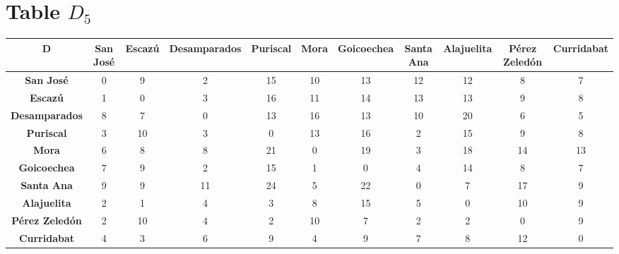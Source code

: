 \documentclass{article}
\begin{document}
\section{Table $D_{5}$}
\begin{center}
    \begin{tabular}{|c||c|c|c|c|c|c|c|c|c|c|}
        \hline
        \textbf{D} & \textbf{San José} & \textbf{Escazú} & \textbf{Desamparados} & \textbf{Puriscal} & \textbf{Mora} & \textbf{Goicoechea} & \textbf{Santa Ana} & \textbf{Alajuelita} & \textbf{Pérez Zeledón} & \textbf{Curridabat} \\
        \hline
        \hline
        \textbf{San José}& 0 & 9 & 2 & 15 & 10 & 13 & 12 & 12 & 8 & 7 \\
        \hline
        \textbf{Escazú}& 1 & 0 & 3 & 16 & 11 & 14 & 13 & 13 & 9 & 8 \\
        \hline
        \textbf{Desamparados}& 8 & 7 & 0 & 13 & 16 & 13 & 10 & 20 & 6 & 5 \\
        \hline
        \textbf{Puriscal}& 3 & 10 & 3 & 0 & 13 & 16 & 2 & 15 & 9 & 8 \\
        \hline
        \textbf{Mora}& 6 & 8 & 8 & 21 & 0 & 19 & 3 & 18 & 14 & 13 \\
        \hline
        \textbf{Goicoechea}& \cellcolor[HTML]{D74894}$7$ & 9 & 2 & 15 & 1 & 0 & \cellcolor[HTML]{D74894}$4$ & 14 & 8 & 7 \\
        \hline
        \textbf{Santa Ana}& 9 & 9 & 11 & 24 & 5 & 22 & 0 & 7 & 17 & 9 \\
        \hline
        \textbf{Alajuelita}& 2 & 1 & 4 & 3 & 8 & 15 & 5 & 0 & 10 & 9 \\
        \hline
        \textbf{Pérez Zeledón}& 2 & 10 & 4 & 2 & 10 & 7 & 2 & 2 & 0 & 9 \\
        \hline
        \textbf{Curridabat}& 4 & 3 & 6 & 9 & 4 & 9 & \cellcolor[HTML]{D74894}$7$ & 8 & 12 & 0 \\
        \hline
    \end{tabular}
\end{center}
\end{document}

